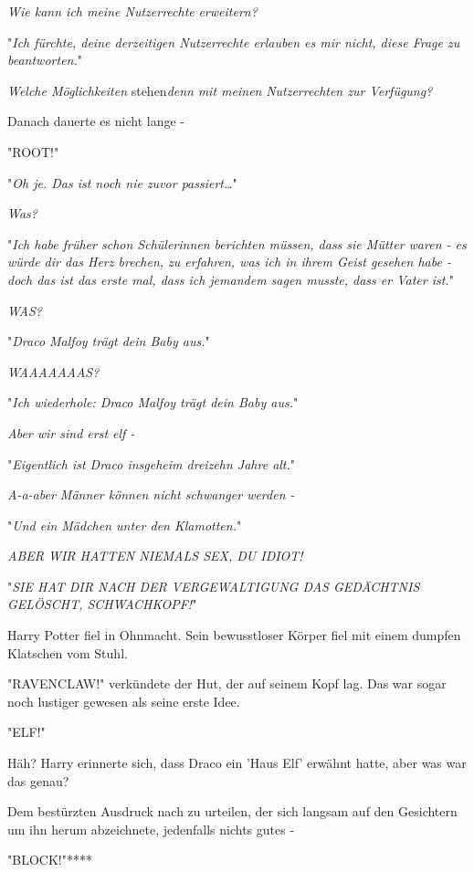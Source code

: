 {\emph{Wie kann ich meine Nutzerrechte} \emph{erweitern?}

"\emph{Ich fürchte, deine derzeitigen Nutzerrechte erlauben es mir nicht, diese Frage zu beantworten.}"

\emph{Welche Möglichkeiten} stehen\emph{denn} \emph{mit meinen} \emph{Nutzerrechten zur Verfügung?}

Danach dauerte es nicht lange -

"ROOT!"

\later

"\emph{Oh je. Das ist noch nie zuvor passiert…}"

\emph{Was?}

"\emph{Ich habe früher schon Schülerinnen berichten müssen, dass sie Mütter waren - es würde dir das Herz brechen, zu erfahren, was ich in ihrem Geist gesehen habe - doch das ist das erste mal, dass ich jemandem sagen musste, dass er Vater ist.}"

\emph{WAS?}

"\emph{Draco Malfoy trägt dein Baby aus.}"

\emph{WAAAAAAAS?}

"\emph{Ich wiederhole: Draco Malfoy trägt dein Baby aus.}"

\emph{Aber wir sind erst elf -}

"\emph{Eigentlich ist Draco insgeheim dreizehn Jahre alt.}"

\emph{A-a-aber Männer können nicht schwanger werden -}

"\emph{Und ein Mädchen unter den Klamotten.}"

\emph{ABER WIR HATTEN NIEMALS SEX, DU IDIOT!}

"\emph{SIE HAT DIR NACH DER VERGEWALTIGUNG DAS GEDÄCHTNIS GELÖSCHT, SCHWACHKOPF!}"

Harry Potter fiel in Ohnmacht. Sein bewusstloser Körper fiel mit einem dumpfen Klatschen vom Stuhl.

"RAVENCLAW!" verkündete der Hut, der auf seinem Kopf lag. Das war sogar noch lustiger gewesen als seine erste Idee.

\later

"ELF!"

Häh? Harry erinnerte sich, dass Draco ein 'Haus Elf' erwähnt hatte, aber was war das genau?

Dem bestürzten Ausdruck nach zu urteilen, der sich langsam auf den Gesichtern um ihn herum abzeichnete, jedenfalls nichts gutes -

\later

"BLOCK!"****

}
